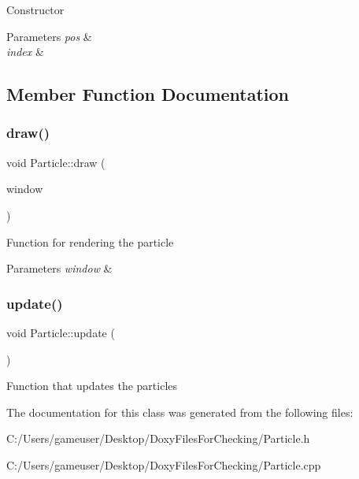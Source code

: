 Constructor 


\begin{DoxyParams}{Parameters}
{\em pos} & \\
\hline
{\em index} & \\
\hline
\end{DoxyParams}


\subsection{Member Function Documentation}
\mbox{\label{class_particle_a7f81b3af6985c5e96e77422dc80e732a}} 
\subsubsection{\texorpdfstring{draw()}{draw()}}
{\footnotesize\ttfamily void Particle\+::draw (\begin{DoxyParamCaption}\item[{sf\+::\+Render\+Window \&}]{window }\end{DoxyParamCaption})}



Function for rendering the particle 


\begin{DoxyParams}{Parameters}
{\em window} & \\
\hline
\end{DoxyParams}
\mbox{\label{class_particle_a686aad22bf7a80a089e117bbc7f4b738}} 
\subsubsection{\texorpdfstring{update()}{update()}}
{\footnotesize\ttfamily void Particle\+::update (\begin{DoxyParamCaption}{ }\end{DoxyParamCaption})}



Function that updates the particles 



The documentation for this class was generated from the following files\+:\begin{DoxyCompactItemize}
\item 
C\+:/\+Users/gameuser/\+Desktop/\+Doxy\+Files\+For\+Checking/Particle.\+h\item 
C\+:/\+Users/gameuser/\+Desktop/\+Doxy\+Files\+For\+Checking/Particle.\+cpp\end{DoxyCompactItemize}
